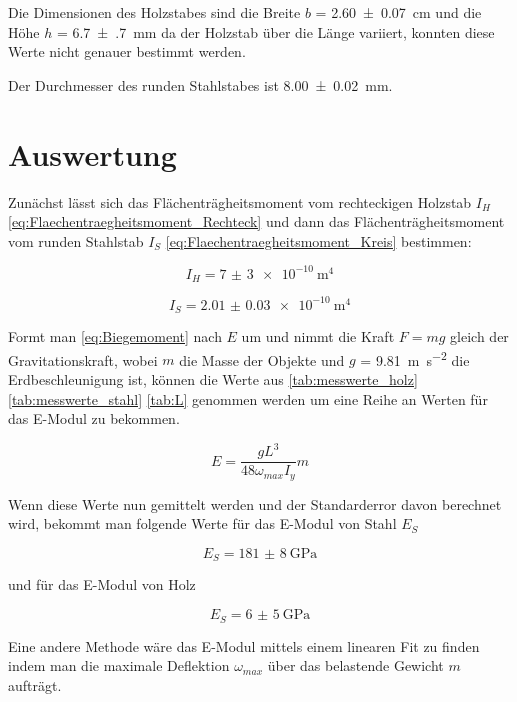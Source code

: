\documentclass[11pt,ngerman]{scrartcl}
\begin{document}
Die Dimensionen des Holzstabes sind die Breite $b$ = \SI{2.60(7)}{\cm} und die Höhe $h$
= \SI{6.7(7)}{\mm}
da der Holzstab über die Länge variiert, konnten
diese Werte nicht genauer bestimmt werden.

Der Durchmesser des runden Stahlstabes ist \SI{8.00(2)}{\mm}.

\section{Auswertung}
\label{sec:auswertung}

Zunächst lässt sich das Flächenträgheitsmoment vom rechteckigen Holzstab
$I_{H}$ \autoref{eq:Flaechentraegheitsmoment_Rechteck} und dann das
Flächenträgheitsmoment vom runden Stahlstab $I_{S}$
\autoref{eq:Flaechentraegheitsmoment_Kreis} bestimmen:

\begin{equation}
	I_H = \SI{7(3)e-10}{\meter\tothe{4}}
\end{equation}

\begin{equation}
	I_S = \SI{2.01(3)e-10}{\meter\tothe{4}}
\end{equation}

Formt man \autoref{eq:Biegemoment} nach $E$ um und nimmt die Kraft $F=mg$ gleich
der Gravitationskraft, wobei $m$ die Masse der Objekte und $g$ = \SI{9.81}{\meter\per\second\squared}
die Erdbeschleunigung ist, können die Werte aus \autoref{tab:messwerte_holz} \ref{tab:messwerte_stahl}
\ref{tab:L} genommen werden um eine Reihe an Werten für das E-Modul zu bekommen.

\begin{equation}
	E = \frac{g L^3}{48\omega_{max}I_y} m
\end{equation}

Wenn diese Werte nun gemittelt werden und der Standarderror davon berechnet wird,
bekommt man folgende Werte für das E-Modul von Stahl $E_S$

\begin{equation}
	E_S = \SI{181(8)}{\GPa}
\end{equation}

und für das E-Modul von Holz

\begin{equation}
	E_S = \SI{6(5)}{\GPa}
\end{equation}

Eine andere Methode wäre das E-Modul mittels einem linearen Fit zu finden
indem man die maximale Deflektion $\omega_{max}$ über das belastende Gewicht
$m$ aufträgt.
\end{document}
